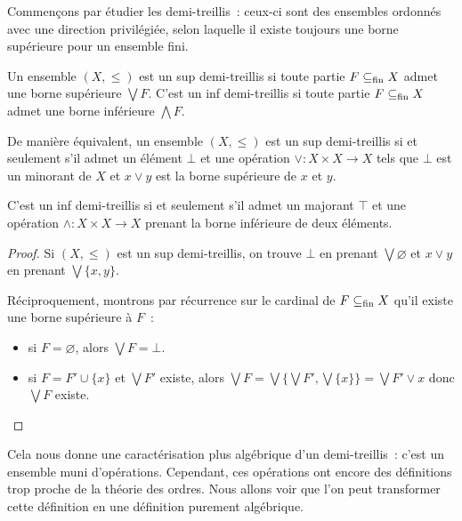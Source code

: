 Commençons par étudier les demi-treillis~: ceux-ci sont des ensembles ordonnés
avec une direction privilégiée, selon laquelle il existe toujours une borne
supérieure pour un ensemble fini.

\begin{definition}
  Un ensemble $(X,\leq)$ est un sup demi-treillis si toute partie $F\subseteq_{\mathrm{fin}} X$
  admet une borne supérieure $\bigvee F$. C'est un inf demi-treillis si toute
  partie $F\subseteq_{\mathrm{fin}} X$ admet une borne inférieure $\bigwedge F$.
\end{definition}

\begin{property}
  De manière équivalent, un ensemble $(X,\leq)$ est un sup demi-treillis si et
  seulement s'il admet un élément $\bot$ et une opération
  $\lor : X \times X \to X$ tels que $\bot$ est un minorant de $X$ et
  $x\lor y$ est la borne supérieure de $x$ et $y$.

  C'est un inf demi-treillis si et seulement s'il admet un majorant $\top$ et
  une opération $\land : X \times X \to X$ prenant la borne inférieure de deux
  éléments.
\end{property}

\begin{proof}
  Si $(X,\leq)$ est un sup demi-treillis, on trouve $\bot$ en prenant
  $\bigvee\varnothing$ et $x\lor y$ en prenant $\bigvee\{x,y\}$.

  Réciproquement, montrons par récurrence sur le cardinal de $F\subseteq_{\mathrm{fin}} X$ qu'il
  existe une borne supérieure à $F$~:
  \begin{itemize}
  \item si $F = \varnothing$, alors $\bigvee F = \bot$.
  \item si $F = F' \cup \{x\}$ et $\bigvee F'$ existe, alors
    $\bigvee F = \bigvee \{\bigvee F',\bigvee \{x\}\} = \bigvee F' \lor x$
    donc $\bigvee F$ existe.
  \end{itemize}
\end{proof}

Cela nous donne une caractérisation plus algébrique d'un demi-treillis~: c'est
un ensemble muni d'opérations. Cependant, ces opérations ont encore des
définitions trop proche de la théorie des ordres. Nous allons voir que l'on peut
transformer cette définition en une définition purement algébrique.

